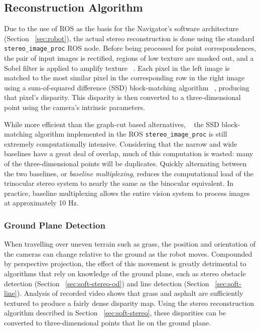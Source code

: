 \documentclass[twocolumn,11pt]{article}
\begin{document}
\subsection{Reconstruction Algorithm}
\label{sec:stereo-algo}
Due to the use of ROS as the basis for the Navigator's software architecture
(Section ~\ref{sec:robot}), the actual stereo reconstruction is done using the
standard \texttt{stereo\_image\_proc} ROS node. Before being processed for
point correspondences, the pair of input images is rectified, regions of low
texture are masked out, and a Sobel filter is applied to amplify texture
~\cite{stereo}. Each pixel in the left image is matched to the most similar
pixel in the corresponding row in the right image using a sum-of-squared
difference (SSD) block-matching algorithm ~\cite{stereo}, producing that
pixel's disparity. This disparity is then converted to a three-dimensional point
using the camera's intrinsic parameters.

While more efficient than the graph-cut based alternatives, ~\cite{stereo} the
SSD block-matching algorithm implemented in the ROS
\texttt{stereo\_image\_proc} is still extremely computationally intensive.
Considering that the narrow and wide baselines have a great deal of overlap,
much of this computation is wasted: many of the three-dimensional points will
be duplicates. Quickly alternating between the two baselines, or
\textit{baseline multiplexing}, reduces the computational load of the
trinocular stereo system to nearly the same as the binocular equivalent. In
practice, baseline multiplexing allows the entire vision system to process
images at approximately 10 Hz.

\subsubsection{Ground Plane Detection}
\label{sec:soft-stereo-ground}
When travelling over uneven terrain such as grass, the position and orientation
of the cameras can change relative to the ground as the robot moves. Compounded
by perspective projection, the effect of this movement is greatly detrimental
to algorithms that rely on knowledge of the ground plane, such as stereo
obstacle detection (Section ~\ref{sec:soft-stereo-od}) and line detection
(Section ~\ref{sec:soft-line}). Analysis of recorded video shows that grass and
asphalt are sufficiently textured to produce a fairly dense disparity map.
Using the stereo reconstruction algorithm described in Section
~\ref{sec:soft-stereo}, these disparities can be converted to three-dimensional
points that lie on the ground plane.
\end{document}

